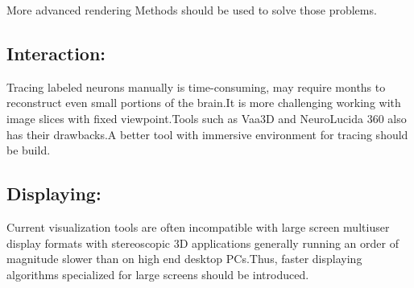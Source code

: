 \documentclass[10pt,twocolumn,letterpaper]{article}
\begin{document}
\setlength{\parindent}{1pc}
More advanced rendering Methods should be used to solve those problems.


\subsection{Interaction:}Tracing labeled neurons manually is time-consuming, may require months to reconstruct even small portions of the brain.It is more challenging working with image slices with fixed viewpoint.Tools such as Vaa3D and NeuroLucida 360 also has their drawbacks.A better tool with immersive environment for tracing should be build.
\subsection{Displaying:}Current visualization tools are often incompatible with large screen multiuser display formats with stereoscopic 3D applications generally running an order of magnitude slower than on high end desktop PCs.Thus, faster displaying algorithms specialized for large screens should be introduced. 
\end{document}

